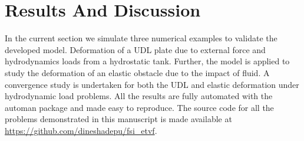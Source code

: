 \section{Results And Discussion}\label{sec3}
In the current section we simulate three numerical examples to validate the
developed model. Deformation of a UDL plate due to external force and
hydrodynamics loads from a hydrostatic tank. Further, the model is applied to
study the deformation of an elastic obstacle due to the impact of fluid. A
convergence study is undertaken for both the UDL and elastic deformation under
hydrodynamic load problems. All the results are fully automated with the automan
package \parencite{automan2018} and made easy to reproduce. The source code for all
the problems demonstrated in this manuscript is made available at
\url{https://github.com/dineshadepu/fsi_etvf}.

